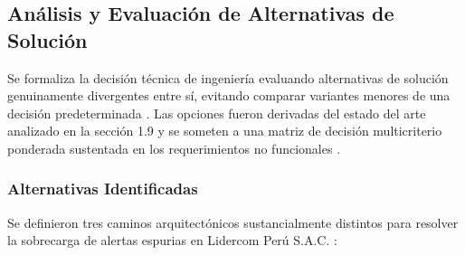 \subsection{Análisis y Evaluación de Alternativas de Solución}
Se formaliza la decisión técnica de ingeniería evaluando alternativas de solución genuinamente divergentes entre sí, evitando comparar variantes menores de una decisión predeterminada \parencite{kendall2019systems}. %
Las opciones fueron derivadas del estado del arte analizado en la sección 1.9 y se someten a una matriz de decisión multicriterio ponderada sustentada en los requerimientos no funcionales \parencite{wiegers2013software, torres2026proyecto}. %

\subsubsection{Alternativas Identificadas}
Se definieron tres caminos arquitectónicos sustancialmente distintos para resolver la sobrecarga de alertas espurias en Lidercom Perú S.A.C. \parencite{kendall2019systems}: %

